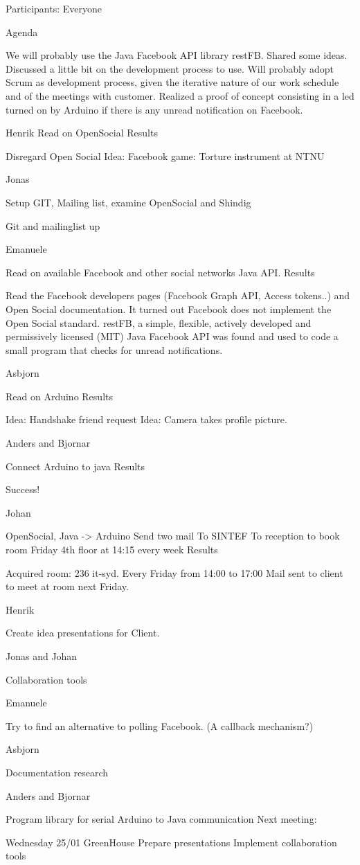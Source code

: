 Participants: Everyone

Agenda


We will probably use the Java Facebook API library restFB. 
Shared some ideas. Discussed a little bit on the development process to use.
Will probably adopt Scrum as development process, given the iterative nature of our work schedule and of the meetings with customer.
Realized a proof of concept consisting in a led turned on by Arduino if there is any unread notification on Facebook.



Henrik
Read on OpenSocial
Results

Disregard Open Social
Idea: Facebook game: Torture instrument at NTNU

Jonas

Setup GIT, Mailing list, examine OpenSocial and Shindig

Git and mailinglist up

Emanuele

Read on available Facebook and other social networks Java API.
Results

Read the Facebook developers pages (Facebook Graph API, Access tokens..)
and Open Social documentation. It turned out Facebook does not implement the Open Social standard. restFB, a simple, flexible, actively developed and permissively licensed (MIT) Java Facebook API was found and used to code a small program that checks for unread notifications.


Asbjorn

Read on Arduino
Results

Idea: Handshake friend request
Idea: Camera takes profile picture.


Anders and Bjornar

Connect Arduino to java
Results

Success!

Johan

OpenSocial, Java -> Arduino
Send two mail
To SINTEF
To reception to book room Friday 4th floor at 14:15 every week
Results

Acquired room: 236 it-syd. Every Friday from 14:00 to 17:00
Mail sent to client to meet at room next Friday.

Henrik

Create idea presentations for Client.

Jonas and Johan

Collaboration tools


Emanuele

Try to find an alternative to polling Facebook. (A callback mechanism?)


Asbjorn

Documentation research


Anders and Bjornar

Program library for serial Arduino to Java communication
Next meeting:

Wednesday 25/01 GreenHouse
Prepare presentations
Implement collaboration tools